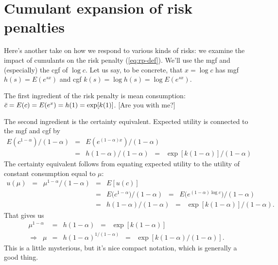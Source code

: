 \section{Cumulant expansion of risk penalties}

Here's another take on how we respond to various kinds of risks:
we examine the impact of cumulants on the risk penalty (\ref{eq:rp-def}).
We'll use the  mgf and (especially) the cgf of $\log c$.
Let us say, to be concrete,
that $x = \log c$ has mgf $h(s) = E (e^{sx})$ and cgf $k(s) = \log h(s) = \log E (e^{sx}) $.

The first ingredient of the risk penalty is mean consumption:
$\bar{c} = E(c) = E (e^x) = h(1) = \exp[k(1)]$.
[Are you with me?]

The second ingredient is the certainty equivalent.
Expected utility is connected to the mgf and cgf by
\begin{eqnarray*}
    E (c^{1-\alpha})/(1-\alpha) &=& E (e^{(1-\alpha) x})/(1-\alpha) \\
        &=&  h(1-\alpha)/(1-\alpha) \;\;=\;\; \exp[k(1-\alpha)]/(1-\alpha)
\end{eqnarray*}
The certainty equivalent follows from equating expected utility to the utility
of constant consumption equal to $\mu$:
\begin{eqnarray*}
    u (\mu) \;\;=\;\; \mu^{1-\alpha}/(1-\alpha)
            &=& E [u(c)]  \\
            &=& E \big( c^{1-\alpha} \big)/(1-\alpha)
                    \;\;=\;\; E \Big( e^{(1-\alpha) \log c} \Big)/(1-\alpha) \\
            &=& h(1-\alpha)/(1-\alpha) \;\;=\;\; \exp[k(1-\alpha)]/(1-\alpha) .
\end{eqnarray*}
That gives us
\begin{eqnarray*}
    \mu^{1-\alpha} &=& h(1-\alpha) \;\;=\;\; \exp[k(1-\alpha)] \\
    \Rightarrow \;\; \mu &=&  h(1-\alpha)^{1/(1-\alpha)} \;\;=\;\; \exp[k(1-\alpha)/(1-\alpha)]  .
\end{eqnarray*}
This is a little mysterious, but it's nice compact notation,
which is generally a good thing.

